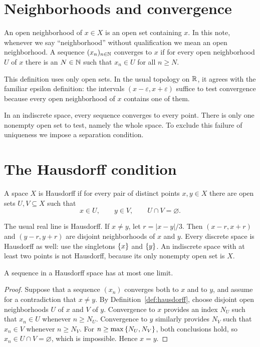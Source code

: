 \documentclass[11pt]{article}
\begin{document}
\section{Neighborhoods and convergence}
An open neighborhood of $x\in X$ is an open set containing $x$.
In this note, whenever we say ``neighborhood'' without qualification we
mean an open neighborhood. A sequence $(x_n)_{n\in\mathbb{N}}$ converges to $x$ if
for every open neighborhood $U$ of $x$ there is an $N\in\mathbb{N}$ such that
$x_n\in U$ for all $n\geq N$.

This definition uses only open sets. In the usual topology on $\mathbb{R}$, it
agrees with the familiar epsilon definition: the intervals
$(x-\varepsilon,x+\varepsilon)$ suffice to test convergence because every
open neighborhood of $x$ contains one of them.

In an indiscrete space, every sequence converges to every point. There is
only one nonempty open set to test, namely the whole space. To exclude this
failure of uniqueness we impose a separation condition.

\section{The Hausdorff condition}
\begin{definition}\label{def:hausdorff}
A space $X$ is Hausdorff if for every pair of distinct points $x,y\in X$
there are open sets $U,V\subseteq X$ such that
\[
  x\in U,\qquad y\in V,\qquad U\cap V=\varnothing.
\]
\end{definition}

\begin{example}
The usual real line is Hausdorff. If $x\ne y$, let
$r=|x-y|/3$. Then $(x-r,x+r)$ and $(y-r,y+r)$ are disjoint neighborhoods
of $x$ and $y$. Every discrete space is Hausdorff as well: use the
singletons $\left\{x\right\}$ and $\left\{y\right\}$. An indiscrete space with at least two
points is not Hausdorff, because its only nonempty open set is $X$.
\end{example}

\begin{proposition}\label{prop:unique-limit}
A sequence in a Hausdorff space has at most one limit.
\end{proposition}
\begin{proof}
Suppose that a sequence $(x_n)$ converges both to $x$ and to $y$, and
assume for a contradiction that $x\ne y$. By
Definition~\ref{def:hausdorff}, choose disjoint open neighborhoods $U$ of
$x$ and $V$ of $y$. Convergence to $x$ provides an index $N_U$ such that
$x_n\in U$ whenever $n\geq N_U$. Convergence to $y$ similarly provides
$N_V$ such that $x_n\in V$ whenever $n\geq N_V$. For
$n\geq\max\left\{N_U,N_V\right\}$, both conclusions hold, so
$x_n\in U\cap V=\varnothing$, which is impossible. Hence $x=y$.
\end{proof}
\end{document}
